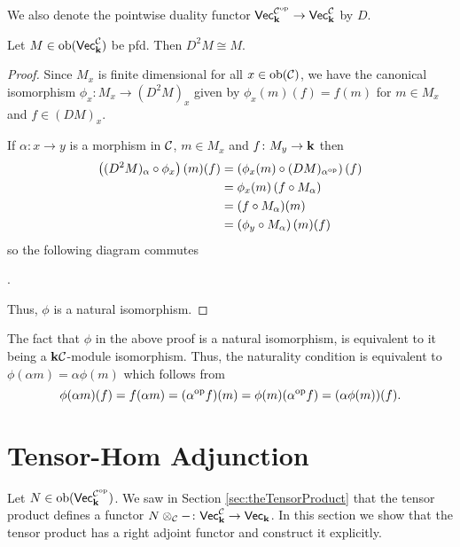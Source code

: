 We also denote the pointwise duality functor $\normalfont\mathsf{Vec}_{\mathbf{k}}^{\mathcal{C}^{\text{op}}}\to\normalfont\mathsf{Vec}_{\mathbf{k}}^{\mathcal{C}}$ by $D$.

\begin{lemma}\label{lemma:doubleDual}
    Let $M\in\operatorname{ob}(\normalfont\mathsf{Vec}_{\mathbf{k}}^{\mathcal{C}})$ be pfd. Then $D^2M\cong M$.
\end{lemma}
\begin{proof}
    Since $M_x$ is finite dimensional for all $x\in\operatorname{ob}(\mathcal{C})$, we have the canonical isomorphism $\phi_x\colon M_x\to\left( D^2M \right)_x$
    given by $\phi_x(m)(f)=f(m)$ for $m\in M_x$ and $f\in (DM)_x$.
    
    If $\alpha\colon x\to y$ is a morphism in $\mathcal{C}$, $m\in M_x$ and $f\colon M_y\to\mathbf{k}$ then
    \begin{align*}
        \left( (D^2M)_\alpha\circ\phi_x \right)(m)(f)&=\left(\phi_x(m)\circ (DM)_{\alpha^{\text{op}}}  \right)(f)\\
        &=\phi_x(m)\left( f\circ M_\alpha \right)\\
        &=(f\circ M_\alpha)(m)\\
        &=\left( \phi_y\circ M_\alpha \right)(m)(f)
    \end{align*}
    so the following diagram commutes
    \begin{center}
        .
    \end{center}
    Thus, $\phi$ is a natural isomorphism.
\end{proof}
\begin{remark}
    The fact that $\phi$ in the above proof is a natural isomorphism, is equivalent to it being a $\mathbf{k}\mathcal{C}$-module isomorphism. 
    Thus, the naturality condition is equivalent to $\phi(\alpha m)=\alpha\phi(m)$ which follows from
    \[\phi(\alpha m)(f)=f(\alpha m)=(\alpha^{\text{op}}f)(m)=\phi(m)(\alpha^{\text{op}}f)=(\alpha\phi(m))(f).\]
\end{remark}

\section{Tensor-Hom Adjunction}\label{sec:tensorHomAdjunction}
Let $N\in\operatorname{ob}(\normalfont\mathsf{Vec}_{\mathbf{k}}^{\mathcal{C}^{\text{op}}})$.
We saw in Section \ref{sec:theTensorProduct} that the tensor product defines a functor $N\otimes_{\mathcal{C}} -\colon \normalfont\mathsf{Vec}_{\mathbf{k}}^{\mathcal{C}}\to\normalfont\mathsf{Vec}_{\mathbf{k}}$.
In this section we show that the tensor product has a right adjoint functor and construct it explicitly.

